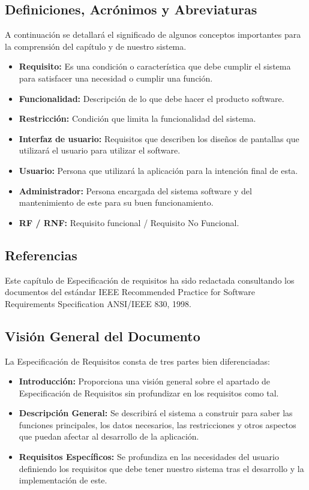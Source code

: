 \subsection{Definiciones, Acrónimos y Abreviaturas}
A continuación se detallará el significado de algunos conceptos importantes para la comprensión del capítulo y de nuestro sistema.
\begin{itemize}
    \item \textbf{Requisito:} Es una condición o característica que debe cumplir el sistema para satisfacer una necesidad o cumplir una función.
    \item \textbf{Funcionalidad:} Descripción de lo que debe hacer el producto software.
    \item \textbf{Restricción:} Condición que limita la funcionalidad del sistema.
    \item \textbf{Interfaz de usuario:} Requisitos que describen los diseños de pantallas que utilizará el usuario para utilizar el software.
    \item \textbf{Usuario: }Persona que utilizará la aplicación para la intención final de esta.
    \item \textbf{Administrador: } Persona encargada del sistema software y del mantenimiento de este para su buen funcionamiento.
    \item \textbf{RF / RNF:} Requisito funcional / Requisito No Funcional.
\end{itemize}

\subsection{Referencias}
Este capítulo de Especificación de requisitos ha sido redactada consultando los documentos del estándar IEEE Recommended Practice for Software Requirements Specification ANSI/IEEE 830, 1998.

\subsection{Visión General del Documento}
La Especificación de Requisitos consta de tres partes bien diferenciadas:
\begin{itemize}
    \item \textbf{Introducción:} Proporciona una visión general sobre el apartado de Especificación de Requisitos sin profundizar en los requisitos como tal.
    \item \textbf{Descripción General:} Se describirá el sistema a construir para saber las funciones principales, los datos necesarios, las restricciones y otros aspectos que puedan afectar al desarrollo de la aplicación.
    \item \textbf{Requisitos Específicos:} Se profundiza en las necesidades del usuario definiendo los requisitos que debe tener nuestro sistema tras el desarrollo y la implementación de este.
\end{itemize}

